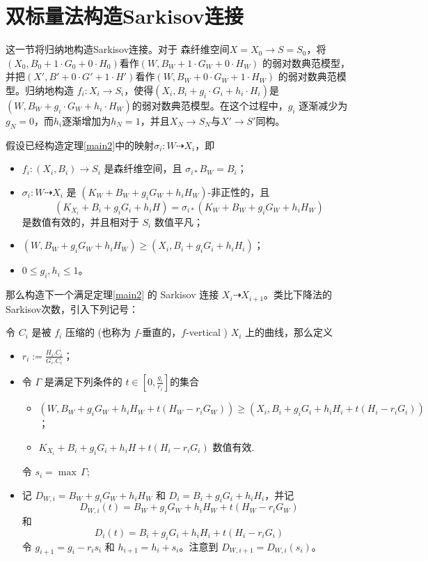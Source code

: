 \section{双标量法构造Sarkisov连接}
这一节将归纳地构造Sarkisov连接。对于 森纤维空间$X=X_{0}\to S=S_{0}$，将$(X_{0},B_{0}+1\cdot G_{0}+0\cdot H_{0}) $看作$(W,B_{W}+1\cdot G_{W}+0\cdot H_{W}) $ 的弱对数典范模型，并把$(X',B'+0\cdot G'+1\cdot H') $看作$(W,B_{W}+0\cdot G_{W}+1\cdot H_{W}) $ 的弱对数典范模型。归纳地构造  $f_{i}:X_{i}\to S_{i}$，使得$(X_{i},B_{i}+g_{i}\cdot G_{i}+h_{i}\cdot H_{i}) $是$(W,B_{W}+g_{i}\cdot G_{W}+h_{i}\cdot H_{W}) $的弱对数典范模型。在这个过程中，$g_{i}$ 逐渐减少为$g_{N}=0$，而$h_{i}$逐渐增加为$h_{N}=1$，并且$X_{N}\to S_{N}$与$X'\to S'$同构。

假设已经构造定理\ref{main2}中的映射$\sigma_{i}:W\dashrightarrow X_{i}$，即
\begin{itemize}
  \item $f_{i}:(X_{i},B_{i})\to S_{i}$ 是森纤维空间，且 $\sigma_{i*} B_{W}=B_{i}$；
  \item $\sigma_{i}:W\dashrightarrow  X_{i}$ 是 $(K_{W}+B_{W}+g_{i}G_{W}+h_{i}H_{W})$-非正性的，且
    \[(K_{X_{i}}+B_{i}+g_{i}G_{i}+h_{i}H)=\sigma_{i*}(K_{W}+B_{W}+g_{i}G_{W}+h_{i}H_{W}) \]
    是数值有效的，并且相对于 $S_{i}$ 数值平凡；
  \item $(W,B_{W}+g_{i}G_{W}+h_{i}H_{W})\geqslant (X_{i},B_{i}+g_{i}G_{i}+h_{i}H_{i})$；
  \item $0\leqslant g_{i},h_{i}\leqslant 1$。
\end{itemize}
那么构造下一个满足定理\ref{main2} 的 Sarkisov 连接 $X_{i}\dashrightarrow X_{i+1}$。类比下降法的Sarkisov次数，引入下列记号：
\begin{definition}\label{doubledegree}
  令 $C_{i}$ 是被 $f_{i}$ 压缩的 (也称为 $f$-垂直的，$f$-vertical )  $X_{i}$ 上的曲线，那么定义
  \begin{itemize}
    \item $r_{i}:=\frac{H_{i}.C_{i}}{G_{i}.C_{i}}$；
    \item 令 $\Gamma$ 是满足下列条件的 $t\in [0,\frac{g_{i}}{r_{i}}] $的集合
      \begin{itemize}
        \item\label{singularcondition} $\left(W,B_{W}+g_{i}G_{W}+h_{i}H_{W}+t(H_{W}-r_{i}G_{W})\right)\geqslant \left(X_{i},B_{i}+g_{i}G_{i}+h_{i}H_{i}+t\left(H_{i}-r_{i}G_{i}\right)\right)$；
        \item $K_{X_{i}}+B_{i}+g_{i}G_i+h_{i}H+t(H_{i}-r_{i}G_{i})$  数值有效.
      \end{itemize}
          令 $s_{i}=\max\, \Gamma $;
    \item 记 $D_{W,i}=B_{W}+g_{i}G_{W}+h_{i}H_{W}$ 和 $D_{i}=B_{i}+g_{i}G_{i}+h_{i}H_{i}$，并记
      \[D_{W,i}(t)=B_{W}+g_{i}G_{W}+h_{i}H_{W}+t(H_{W}-r_{i}G_{W})\]
      和
      \[D_{i}(t)=B_{i}+g_{i}G_{i}+h_{i}H_{i}+t (H_{i}-r_{i}G_{i})\]
      令 $g_{i+1}=g_{i}-r_{i}s_{i}$ 和 $h_{i+1}=h_{i}+s_{i}$。注意到 $D_{W,i+1}=D_{W,i}(s_{i})$。
  \end{itemize}
\end{definition}
